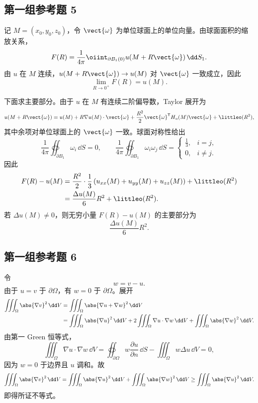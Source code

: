 \subsection*{第一组参考题 5}
\begin{xsolution}
记 $M=(x_0,y_0,z_0)$，令 $\vect{\omega}$ 为单位球面上的单位向量。由球面面积的缩放关系，
\[
  F(R)=\frac{1}{4\pi}\oiint_{\partial B_1(0)}u(M+R\vect{\omega})\,\dd S_1.
\]
由 $u$ 在 $M$ 连续，$u(M+R\vect{\omega})\to u(M)$ 对 $\vect{\omega}$ 一致成立，因此
\[
  \lim_{R\to0^+}F(R)=u(M).
\]

下面求主要部分。由于 $u$ 在 $M$ 有连续二阶偏导数，Taylor 展开为
\[
  u(M+R\vect{\omega})
  =u(M)+R\nabla u(M)\cdot\vect{\omega}
  +\frac{R^2}{2}\vect{\omega}^{\mathsf T}H_u(M)\vect{\omega}
  +\littleo(R^2),
\]
其中余项对单位球面上的 $\vect{\omega}$ 一致。球面对称性给出
\[
  \frac1{4\pi}\oiint_{\partial B_1}\omega_i\,\dd S=0,
  \qquad
  \frac1{4\pi}\oiint_{\partial B_1}\omega_i\omega_j\,\dd S
  =\begin{cases}
  \frac13,&i=j,\\
  0,&i\ne j.
  \end{cases}
\]
因此
\begin{align*}
  F(R)-u(M)
  &=\frac{R^2}{2}\cdot\frac13
  \left(u_{xx}(M)+u_{yy}(M)+u_{zz}(M)\right)
  +\littleo(R^2)\\
  &=\frac{\Delta u(M)}{6}R^2+\littleo(R^2).
\end{align*}
若 $\Delta u(M)\ne0$，则无穷小量 $F(R)-u(M)$ 的主要部分为
\[
  \boxed{\frac{\Delta u(M)}6R^2}.
\]
\end{xsolution}

\subsection*{第一组参考题 6}
\begin{xsolution}
令
\[
  w=v-u.
\]
由于 $u=v$ 于 $\partial\Omega$，有 $w=0$ 于 $\partial\Omega$。展开
\begin{align*}
  \iiint_\Omega\abs{\nabla v}^2\,\dd V
  &=\iiint_\Omega\abs{\nabla u+\nabla w}^2\,\dd V\\
  &=\iiint_\Omega\abs{\nabla u}^2\,\dd V
    +2\iiint_\Omega\nabla u\cdot\nabla w\,\dd V
    +\iiint_\Omega\abs{\nabla w}^2\,\dd V.
\end{align*}
由第一 Green 恒等式，
\[
  \iiint_\Omega\nabla u\cdot\nabla w\,\dd V
  =\oiint_{\partial\Omega}w\frac{\partial u}{\partial n}\,\dd S
  -\iiint_\Omega w\Delta u\,\dd V=0,
\]
因为 $w=0$ 于边界且 $u$ 调和。故
\[
  \iiint_\Omega\abs{\nabla v}^2\,\dd V
  =\iiint_\Omega\abs{\nabla u}^2\,\dd V
  +\iiint_\Omega\abs{\nabla w}^2\,\dd V
  \ge\iiint_\Omega\abs{\nabla u}^2\,\dd V.
\]
即得所证不等式。
\end{xsolution}

